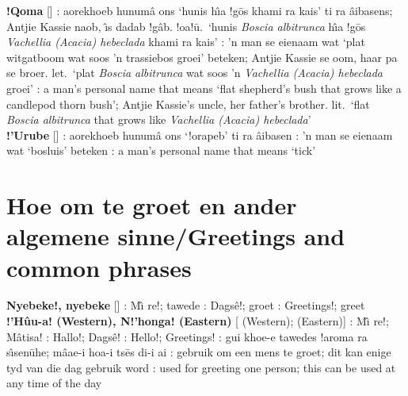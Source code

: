 \textbf{!Qoma} [] : aorekhoeb
\textdoublebarpipe{}hunum\^{a} \textvertline{}ons
`\textvertline{}hunis h\^{\i}a !g\={o}s khami ra kais' ti ra
\textdoublebarpipe{}\^{a}ibasens; Antjie Kassie
\textdoublevertline{}naob, \textdoublevertline{}\^{\i}s dadab
!g\^{a}b. !oa!\={u}.\ `\textvertline{}hunis \emph{Boscia albitrunca}
h\^{\i}a !g\={o}s \emph{Vachellia (Acacia) hebeclada} khami ra kais'
: 'n man se eienaam wat `plat witgatboom wat soos 'n
trassiebos groei' beteken; Antjie Kassie se oom, haar pa se broer.
let.\ `plat \emph{Boscia albitrunca} wat soos 'n \emph{Vachellia
(Acacia) hebeclada} groei' : a man's personal name that
means `flat shepherd's bush that grows like a candlepod thorn bush';
Antjie Kassie's uncle, her father's brother. lit.\ `flat \emph{Boscia
albitrunca} that grows like \emph{Vachellia (Acacia) hebeclada}' \\

\textbf{!'Urube} []
: aorekhoeb \textdoublebarpipe{}hunum\^{a}
\textvertline{}ons `!orapeb' ti ra \textdoublebarpipe{}\^{a}ibasen
: 'n man se eienaam wat `bosluis' beteken
: a man's personal name that means `tick' \\



\markboth{}{}
\tocless\section{Hoe om te groet en ander algemene sinne/Greetings and\\
common phrases}
\markboth{}{}

\textbf{Nyebeke!, nyebeke} [] : M\^{\i} re!; tawede
: Dags\^{e}!; groet : Greetings!; greet
\\

\textbf{!'H\^{u}u-a! (Western), N!'honga! (Eastern)}
[ (Western);
 (Eastern)] : M\^{\i} re!;
M\^{a}tisa! : Hallo!; Dags\^{e}! : Hello!;
Greetings! : \textvertline{}gui khoe-e tawedes !aroma
ra s\^{\i}sen\={u}he; m\^{a}\textdoublevertline{}ae-i hoa-i ts\={e}s
di-i ai : gebruik om een mens te groet; dit kan enige
tyd van die dag gebruik word : used for greeting one
person; this can be used at any time of the day \\

